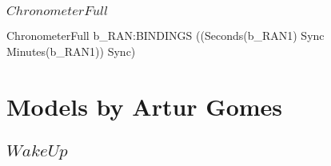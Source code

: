\subsubsection{$ChronometerFull$}

\begin{circus}
  \circprocess ChronometerFull \circdef b\_RAN:BINDINGS \circspot ((Seconds(b\_RAN1) \lpar Sync \rpar Minutes(b\_RAN1)) \circhide Sync)
\end{circus}
%
\section{Models by Artur Gomes}

\subsection{$WakeUp$}

